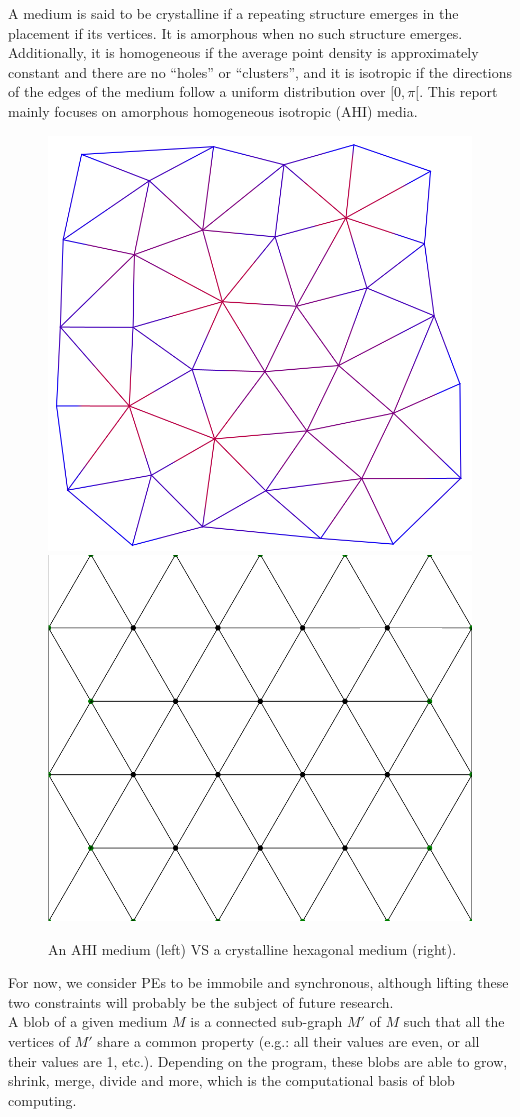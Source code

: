 \documentclass{article}
\begin{document}
A medium is said to be crystalline if a repeating structure emerges in the placement if its vertices. It is amorphous when no such structure emerges. Additionally, it is homogeneous if the average point density is approximately constant and there are no
“holes” or “clusters”, and it is isotropic if the directions of the edges of the medium follow a uniform distribution over $[0, \pi[$. This report mainly focuses on amorphous homogeneous isotropic (AHI) media.

\begin{figure}[H]
	\centering\includegraphics[width=0.4\linewidth]{assets/amorphous_medium.png}
	\hspace{0.1\linewidth}
	\centering\includegraphics[width=0.4\linewidth]{assets/hexagonal_medium.png}
	\caption{An AHI medium (left) VS a crystalline hexagonal medium (right).}
	\label{fig:amorphous_vs_crystaline}
\end{figure}

For now, we consider PEs to be immobile and synchronous, although lifting these two constraints will probably be the subject of future research.\\

A blob of a given medium $M$ is a connected sub-graph $M'$ of $M$ such that all the vertices of $M'$ share a common property (e.g.: all their values are even, or all their values are 1, etc.). Depending on the program, these blobs are able to grow, shrink, merge, divide and more, which is the computational basis of blob computing\supercite{blob_computing2}.
\end{document}
